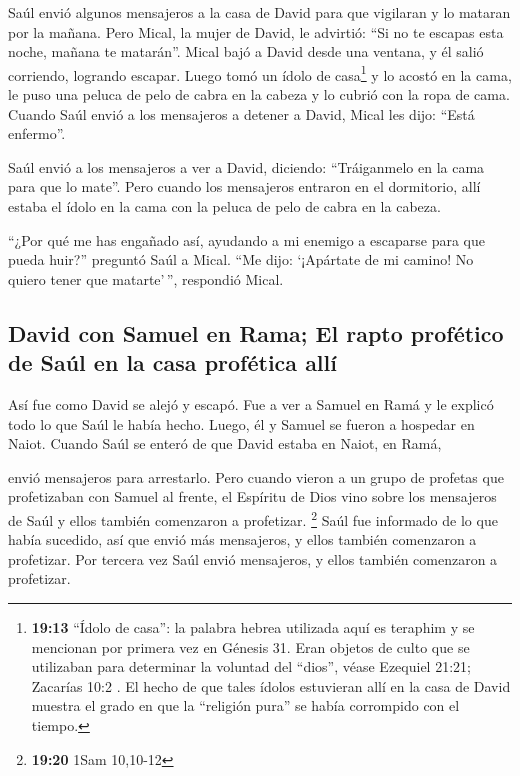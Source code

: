  Saúl envió algunos mensajeros a la casa de David para
que vigilaran y lo mataran por la mañana. Pero Mical, la mujer de David,
le advirtió: ``Si no te escapas esta noche, mañana te matarán''.
 Mical bajó a David desde una ventana, y él salió
corriendo, logrando escapar.  Luego tomó un ídolo de
casa\footnote{\textbf{19:13} ``Ídolo de casa'': la palabra hebrea
  utilizada aquí es teraphim y se mencionan por primera vez en Génesis
  31. Eran objetos de culto que se utilizaban para determinar la
  voluntad del ``dios'', véase Ezequiel 21:21; Zacarías 10:2 . El hecho
  de que tales ídolos estuvieran allí en la casa de David muestra el
  grado en que la ``religión pura'' se había corrompido con el tiempo.}
y lo acostó en la cama, le puso una peluca de pelo de cabra en la cabeza
y lo cubrió con la ropa de cama.  Cuando Saúl envió a los
mensajeros a detener a David, Mical les dijo: ``Está enfermo''.

 Saúl envió a los mensajeros a ver a David, diciendo:
``Tráiganmelo en la cama para que lo mate''.  Pero cuando
los mensajeros entraron en el dormitorio, allí estaba el ídolo en la
cama con la peluca de pelo de cabra en la cabeza.

 ``¿Por qué me has engañado así, ayudando a mi enemigo a
escaparse para que pueda huir?'' preguntó Saúl a Mical. ``Me dijo:
`¡Apártate de mi camino! No quiero tener que matarte'\,'', respondió
Mical.

\hypertarget{david-con-samuel-en-rama-el-rapto-profuxe9tico-de-sauxfal-en-la-casa-profuxe9tica-alluxed}{%
\subsection{David con Samuel en Rama; El rapto profético de Saúl en la
casa profética
allí}\label{david-con-samuel-en-rama-el-rapto-profuxe9tico-de-sauxfal-en-la-casa-profuxe9tica-alluxed}}

 Así fue como David se alejó y escapó. Fue a ver a Samuel
en Ramá y le explicó todo lo que Saúl le había hecho. Luego, él y Samuel
se fueron a hospedar en Naiot.  Cuando Saúl se enteró de
que David estaba en Naiot, en Ramá,

 envió mensajeros para arrestarlo. Pero cuando vieron a
un grupo de profetas que profetizaban con Samuel al frente, el Espíritu
de Dios vino sobre los mensajeros de Saúl y ellos también comenzaron a
profetizar. \footnote{\textbf{19:20} 1Sam 10,10-12}  Saúl
fue informado de lo que había sucedido, así que envió más mensajeros, y
ellos también comenzaron a profetizar.  Por tercera vez
Saúl envió mensajeros, y ellos también comenzaron a profetizar.

